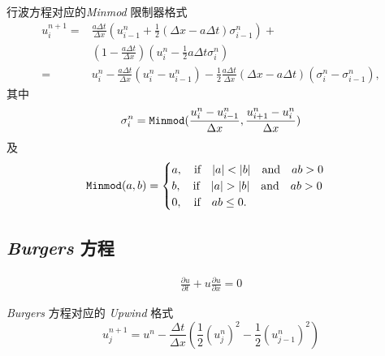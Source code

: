 \documentclass[10.5pt
]{article}
\begin{document}
 
行波方程对应的\textit{Minmod} 限制器格式
\begin{equation}
\begin{aligned}
u_i^{n+1}= & \frac{a \Delta t}{\Delta x}\left(u_{i-1}^n+\frac{1}{2}(\Delta x-a \Delta t) \sigma_{i-1}^n\right)+ \\
& \left(1-\frac{a \Delta t}{\Delta x}\right)\left(u_i^n-\frac{1}{2} a \Delta t \sigma_i^n\right) \\
= & u_i^n-\frac{a \Delta t}{\Delta x}\left(u_i^n-u_{i-1}^n\right)-\frac{1}{2} \frac{a \Delta t}{\Delta x}(\Delta x-a \Delta t)\left(\sigma_i^n-\sigma_{i-1}^n\right),
\end{aligned}
\end{equation}
其中
\begin{equation}
	\sigma_i^n = \verb|Minmod| ( \frac{u_i^n - u_{i-1}^{n}}{ \Delta x }, \frac{u_{i+1}^n - u_{i}^{n}}{ \Delta x } )
\end{equation}
及
\begin{equation}
	\verb|Minmod|(a, b) = 
	\begin{cases}
		a, \qif |a| < |b| \qand ab > 0\\
		b, \qif |a| > |b| \qand ab > 0\\
		0, \qif ab \leq 0.
	\end{cases}
\end{equation}

\subsection{\textit{Burgers} 方程}

\begin{align}
\frac{\partial u}{\partial t} + u \frac{\partial u}{\partial x} = 0
\end{align}

\textit{Burgers} 方程对应的 \textit{Upwind} 格式
\begin{equation}
u_j^{n+1} = u^n - \frac{\Delta t}{\Delta x} \left( \frac{1}{2} (u_j^n)^2 - \frac{1}{2} (u_{j-1}^n)^2\right)
\end{equation}
\end{document}
